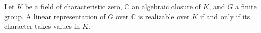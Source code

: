 
Let $K$ be a field of characteristic zero, $\mathbb{C}$ an algebraic closure of $K$, and $G$ a finite group. A linear representation of $G$ over $\mathbb{C}$ is realizable over $K$ if and only if its character takes values in $K$.

